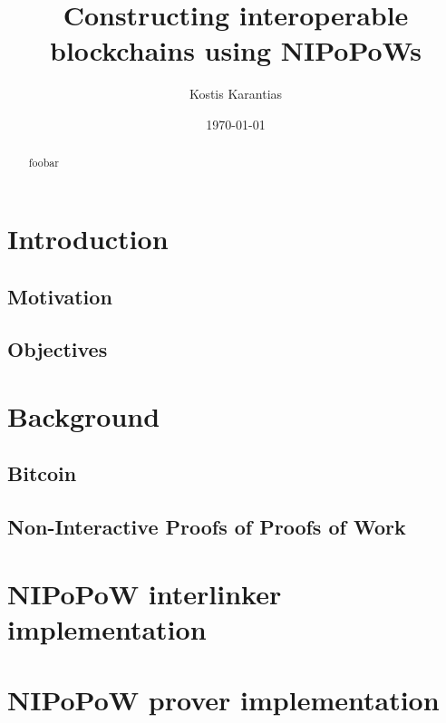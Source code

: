 \documentclass[11pt]{llncs}
\begin{document}
\title{Constructing interoperable blockchains using NIPoPoWs}
\date{\today}
\author{Kostis Karantias\\
    }
\maketitle
\noindent
\makebox[\linewidth]{\small \today}

\newpage

\begin{abstract}
    foobar
\end{abstract}

\newpage

\tableofcontents

\newpage

\thispagestyle{plain}

\section{Introduction}

\subsection{Motivation}
\subsection{Objectives}

\section{Background}

\subsection{Bitcoin}
\subsection{Non-Interactive Proofs of Proofs of Work}

\section{NIPoPoW interlinker implementation}
\section{NIPoPoW prover implementation}


\end{document}
